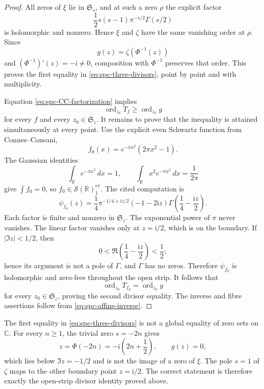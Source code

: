 \begin{proof}
All zeros of \(\xi\) lie in \(\mathfrak S_s\), and at such a zero \(\rho\)
the explicit factor
\[
 \frac12s(s-1)\pi^{-s/2}\Gamma(s/2)
\]
is holomorphic and nonzero.  Hence \(\xi\) and \(\zeta\) have the same
vanishing order at \(\rho\).  Since
\[
 g(z)=\zeta(\Phi^{-1}(z))
\]
and \((\Phi^{-1})'(z)=-\mathrm i\ne0\), composition with
\(\Phi^{-1}\) preserves that order.  This proves the first equality in
\eqref{eq:spc-three-divisors}, point by point and with multiplicity.

Equation \eqref{eq:spc-CC-factorization} implies
\[
 \operatorname{ord}_{z_0}T_f
 \geq
 \operatorname{ord}_{z_0}g
\]
for every \(f\) and every \(z_0\in\mathfrak S_z\).  It remains to prove that
the inequality is attained simultaneously at every point.  Use the explicit
even Schwartz function from Connes--Consani,
\begin{equation}
\label{eq:spc-explicit-witness}
 f_0(x)=e^{-\pi x^2}(2\pi x^2-1).
\end{equation}
The Gaussian identities
\[
 \int_{\mathbb R}e^{-\pi x^2}\,dx=1,
 \qquad
 \int_{\mathbb R}x^2e^{-\pi x^2}\,dx=\frac1{2\pi}
\]
give \(\int f_0=0\), so \(f_0\in\mathcal S(\mathbb R)^{\mathrm{ev}}_1\).
The cited computation is
\begin{equation}
\label{eq:spc-explicit-psi}
 \psi_{f_0}(z)
 =
 \frac14\pi^{-1/4+\mathrm iz/2}
 (-1-2\mathrm iz)
 \Gamma\left(\frac14-\frac{\mathrm iz}{2}\right).
\end{equation}
Each factor is finite and nonzero in \(\mathfrak S_z\).  The exponential
power of \(\pi\) never vanishes.  The linear factor vanishes only at
\(z=\mathrm i/2\), which is on the boundary.  If \(|\Im z|<1/2\), then
\[
 0<\Re\left(\frac14-\frac{\mathrm iz}{2}\right)<\frac12;
\]
hence its argument is not a pole of \(\Gamma\), and \(\Gamma\) has no zeros.
Therefore \(\psi_{f_0}\) is holomorphic and zero-free throughout the open
strip.  It follows that
\[
 \operatorname{ord}_{z_0}T_{f_0}
 =
 \operatorname{ord}_{z_0}g
\]
for every \(z_0\in\mathfrak S_z\), proving the second divisor equality.
The inverse and fibre assertions follow from
\eqref{eq:spc-affine-inverse}.
\end{proof}

\begin{remark}
\label{rem:spc-strip-essential}
The first equality in \eqref{eq:spc-three-divisors} is not a global equality
of zero sets on \(\mathbb C\).  For every \(n\geq1\), the trivial zero
\(s=-2n\) gives
\[
 z=\Phi(-2n)=-\mathrm i\left(2n+\frac12\right),
 \qquad
 g(z)=0,
\]
which lies below \(\Im z=-1/2\) and is not the image of a zero of \(\xi\).
The pole \(s=1\) of \(\zeta\) maps to the other boundary point
\(z=\mathrm i/2\).  The correct statement is therefore exactly the
open-strip divisor identity proved above.
\end{remark}

